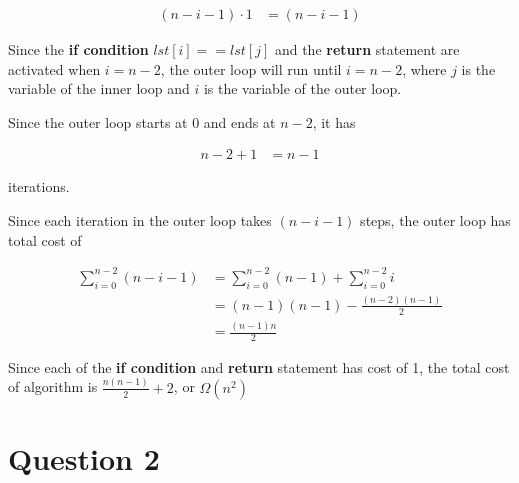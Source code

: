 \documentclass[12pt]{article}
\begin{document}
\begin{enumerate}[a.]
\begin{tcolorbox}
        \begin{align}
            (n-i-1) \cdot 1 &= (n-i-1)
        \end{align}

        \bigskip

        Since the \textbf{if condition} $lst[i] == lst[j]$ and the \textbf{return}
        statement are activated when $i=n-2$, the outer loop will run until $i=n-2$,
        where $j$ is the variable of the inner loop and $i$ is the variable of
        the outer loop.

        \bigskip

        Since the outer loop starts at 0 and ends at $n-2$, it has

        \begin{align}
            n-2+1 &= n-1
        \end{align}

        iterations.

        \bigskip

        Since each iteration in the outer loop takes $(n-i-1)$ steps, the outer
        loop has total cost of

        \begin{align}
            \sum\limits_{i=0}^{n-2} (n-i-1) &= \sum\limits_{i=0}^{n-2} (n-1) + \sum\limits_{i=0}^{n-2} i\\
            &= (n-1)(n-1) - \frac{(n-2)(n-1)}{2}\\
            &= \frac{(n-1)n}{2}
        \end{align}

        Since each of the \textbf{if condition} and \textbf{return} statement has cost of 1,
        the total cost of algorithm is $\frac{n(n-1)}{2} + 2$, or $\Omega(n^2)$

    \end{tcolorbox}

\end{enumerate}

\section*{Question 2}
\end{document}
